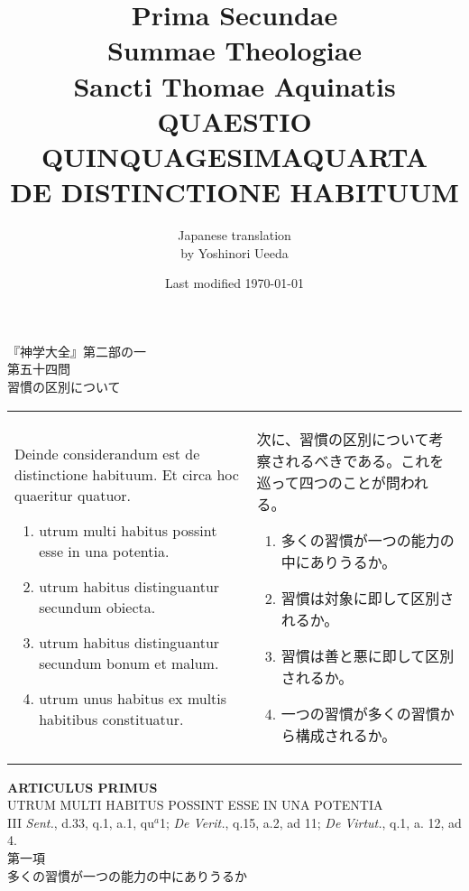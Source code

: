 \documentclass[10pt]{jsarticle} %
\title{{\bf Prima Secundae}\\{\HUGE Summae Theologiae}\\Sancti Thomae
Aquinatis\\{\sffamily QUAESTIO QUINQUAGESIMAQUARTA}\\{\bf DE DISTINCTIONE HABITUUM}}
\author{Japanese translation\\by Yoshinori {\sc Ueeda}}
\date{Last modified \today}
\begin{document}
\maketitle
\thispagestyle{empty}
\begin{center}
{\Large 『神学大全』第二部の一\\第五十四問\\習慣の区別について}
\end{center}


\begin{longtable}{p{21em}p{21em}}
Deinde considerandum est de distinctione habituum. Et circa hoc quaeritur quatuor.



\begin{enumerate}
 \item utrum multi habitus possint esse in una potentia.
 \item utrum habitus distinguantur secundum obiecta.
 \item utrum habitus distinguantur secundum bonum et malum.
 \item utrum unus habitus ex multis habitibus constituatur.
\end{enumerate}

&

次に、習慣の区別について考察されるべきである。これを巡って四つのことが問われる。
\begin{enumerate}
 \item 多くの習慣が一つの能力の中にありうるか。
 \item 習慣は対象に即して区別されるか。
 \item 習慣は善と悪に即して区別されるか。
 \item 一つの習慣が多くの習慣から構成されるか。
\end{enumerate}
\end{longtable}
\newpage
{}
\begin{center}
{\Large {\bf ARTICULUS PRIMUS}}\\
{\large UTRUM MULTI HABITUS POSSINT ESSE IN UNA POTENTIA}\\
{\footnotesize III {\itshape Sent.}, d.33, q.1, a.1, qu$^a$1; {\itshape De Verit.}, q.15, a.2, ad 11; {\itshape De Virtut.}, q.1, a. 12, ad 4.}\\
{\Large 第一項\\多くの習慣が一つの能力の中にありうるか}
\end{center}
\end{document}
